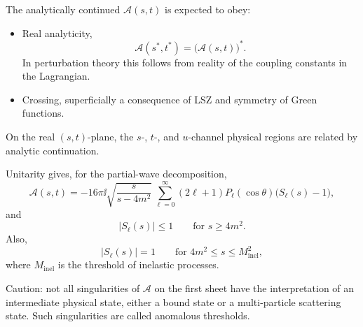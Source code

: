 The analytically continued \(\mathcal A(s,t)\) is expected to obey:
\begin{itemize}
\item Real analyticity,
\[
  \mathcal A(s^*,t^*)=\bigl(\mathcal A(s,t)\bigr)^* .
\]
In perturbation theory this follows from reality of the coupling
constants in the Lagrangian.
\item Crossing, superficially a consequence of LSZ and symmetry of Green
functions.
\end{itemize}

On the real \((s,t)\)-plane, the \(s\)-, \(t\)-, and \(u\)-channel
physical regions are related by analytic continuation.

\begin{center}
\end{center}

Unitarity gives, for the partial-wave decomposition,
\[
  \mathcal A(s,t)
  =
  -16\pi\ii
  \sqrt{\frac{s}{s-4m^2}}\,
  \sum_{\ell=0}^{\infty}
  (2\ell+1)P_\ell(\cos\theta)\bigl(S_\ell(s)-1\bigr),
\]
and
\[
  |S_\ell(s)|\leq1\qquad\text{for }s\geq4m^2.
\]
Also,
\[
  |S_\ell(s)|=1
  \qquad\text{for }4m^2\leq s\leq M_{\mathrm{inel}}^2,
\]
where \(M_{\mathrm{inel}}\) is the threshold of inelastic processes.

Caution: not all singularities of \(\mathcal A\) on the first sheet have
the interpretation of an intermediate physical state, either a bound
state or a multi-particle scattering state.  Such singularities are
called anomalous thresholds.


